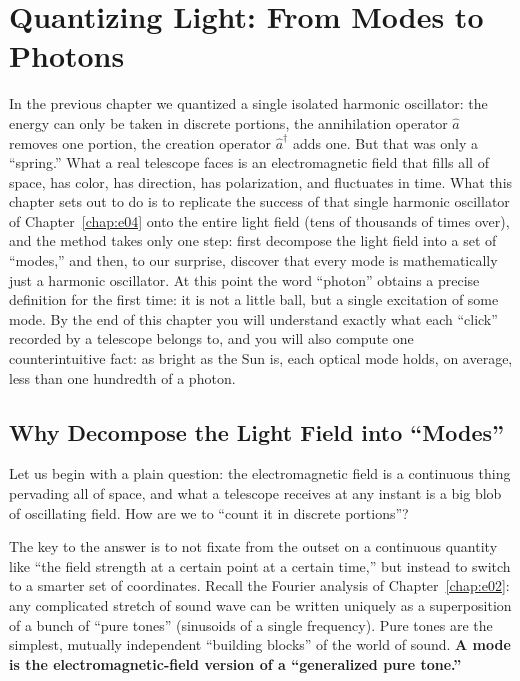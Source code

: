 \chapter{Quantizing Light: From Modes to Photons}
\label{chap:e05}

\begin{chapteropening}
In the previous chapter we quantized a single isolated harmonic oscillator: the energy can only be taken in discrete portions, the annihilation operator \(\hat a\) removes one portion, the creation operator \(\hat a^\dagger\) adds one. But that was only a ``spring.'' What a real telescope faces is an electromagnetic field that fills all of space, has color, has direction, has polarization, and fluctuates in time. What this chapter sets out to do is to replicate the success of that single harmonic oscillator of Chapter~\ref{chap:e04} onto the entire light field (tens of thousands of times over), and the method takes only one step: first decompose the light field into a set of ``modes,'' and then, to our surprise, discover that every mode is mathematically just a harmonic oscillator. At this point the word ``photon'' obtains a precise definition for the first time: it is not a little ball, but a single excitation of some mode. By the end of this chapter you will understand exactly what each ``click'' recorded by a telescope belongs to, and you will also compute one counterintuitive fact: as bright as the Sun is, each optical mode holds, on average, less than one hundredth of a photon.
\end{chapteropening}

\section{Why Decompose the Light Field into ``Modes''}
\label{sec:e05-why-modes}

Let us begin with a plain question: the electromagnetic field is a continuous thing pervading all of space, and what a telescope receives at any instant is a big blob of oscillating field. How are we to ``count it in discrete portions''?

The key to the answer is to not fixate from the outset on a continuous quantity like ``the field strength at a certain point at a certain time,'' but instead to switch to a smarter set of coordinates. Recall the Fourier analysis of Chapter~\ref{chap:e02}: any complicated stretch of sound wave can be written uniquely as a superposition of a bunch of ``pure tones'' (sinusoids of a single frequency). Pure tones are the simplest, mutually independent ``building blocks'' of the world of sound. \textbf{A mode is the electromagnetic-field version of a ``generalized pure tone.''}

